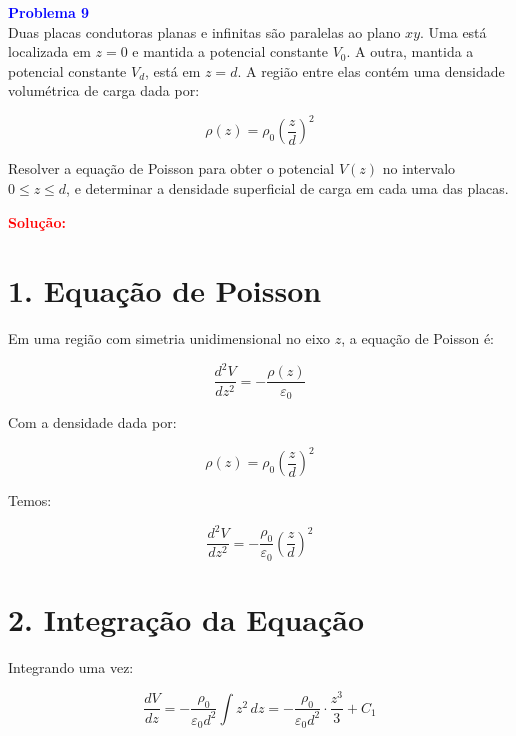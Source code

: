 \documentclass[a4paper,12pt]{article}
\begin{document}
\begin{flushleft}
\textbf{\textcolor{blue}{\Large Problema 9}}\\

Duas placas condutoras planas e infinitas são paralelas ao plano \( xy \). Uma está localizada
em \( z = 0 \) e mantida a potencial constante \( V_0 \). A outra, mantida a potencial 
constante \( V_d \), está em \( z = d \). A região entre elas contém uma densidade volumétrica 
de carga dada por:

\begin{equation}
\rho(z) = \rho_0 \left( \frac{z}{d} \right)^2
\end{equation}

Resolver a equação de Poisson para obter o potencial \( V(z) \) no intervalo \( 0 \leq z \leq d \), 
e determinar a densidade superficial de carga em cada uma das placas.

\textcolor{red}{\textbf{Solução:}}\\


\section*{1. Equação de Poisson}

Em uma região com simetria unidimensional no eixo \( z \), a equação de Poisson é:

\begin{equation}
\frac{d^2 V}{dz^2} = -\frac{\rho(z)}{\varepsilon_0}
\end{equation}

Com a densidade dada por:

\begin{equation}
\rho(z) = \rho_0 \left( \frac{z}{d} \right)^2
\end{equation}

Temos:

\begin{equation}
\frac{d^2 V}{dz^2} = -\frac{\rho_0}{\varepsilon_0} \left( \frac{z}{d} \right)^2
\end{equation}

\section*{2. Integração da Equação}

Integrando uma vez:

\begin{equation}
\frac{dV}{dz} = -\frac{\rho_0}{\varepsilon_0 d^2} \int z^2 \, dz = -\frac{\rho_0}{\varepsilon_0 d^2} \cdot \frac{z^3}{3} + C_1
\end{equation}


\end{flushleft}
\end{document}
